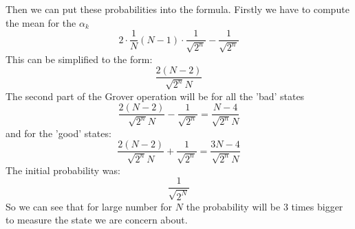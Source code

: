 \documentclass[a4paper,10pt]{article}
\newcommand{\al}{\ensuremath{\alpha}}
\begin{document}
\begin{enumerate}[a)]
Then we can put these probabilities into the formula.
Firstly we have to compute the mean for the $\al_k$
$$
2\cdot\frac{1}{N}\left(N-1\right)\cdot\frac{1}{\sqrt{2^n}}-\frac{1}{\sqrt{2^n}}
$$
This can be simplified to the form:
$$
\frac{2 (N-2)}{\sqrt{2^n} N}
$$
The second part of the Grover operation will be for all the 'bad' states
$$
\frac{2 (N-2)}{\sqrt{2^n} N}-\frac{1}{\sqrt{2^n}} = \frac{N-4}{\sqrt{2^n} N}
$$
and for the 'good' states:
$$
\frac{2 (N-2)}{\sqrt{2^n} N}+\frac{1}{\sqrt{2^n}} = 
\frac{3 N-4}{\sqrt{2^n} N}
$$
The initial probability was:
$$
\frac{1}{\sqrt{2^N}}
$$
So we can see that for large number for $N$ the probability will be 3 times bigger to measure the state we are concern about.
\end{enumerate}
\end{document}
